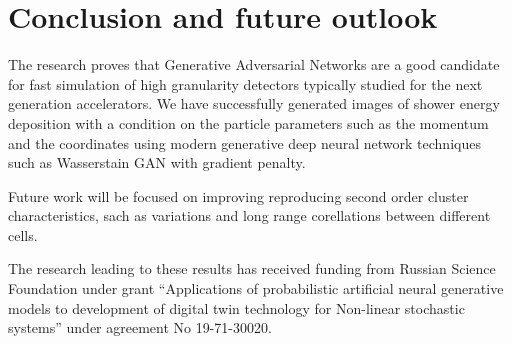 \section{Conclusion and future outlook}\label{conclusion}

The research proves that Generative Adversarial Networks are a good candidate for fast simulation of high granularity detectors typically studied for the next generation accelerators. We have successfully generated images of shower energy deposition with a condition on the particle parameters such as the momentum and the coordinates using modern generative deep neural network techniques such as Wasserstain GAN with gradient penalty.

Future work will be focused on improving reproducing second order cluster characteristics, sach as variations and long range corellations between different cells.

The research leading to these results has received funding from Russian Science Foundation under grant ``Applications of probabilistic artificial neural generative models to development of digital twin technology for Non-linear stochastic systems'' under agreement No 19-71-30020. 